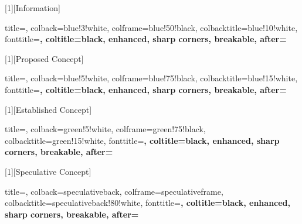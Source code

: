 \usepackage{etoolbox}
\usepackage[most]{tcolorbox}
\usepackage{graphicx}
\usepackage{xparse}

\usepackage{float}
\let\origfigure\figure
\let\endorigfigure\endfigure
\renewenvironment{figure}[1][H]{\origfigure[H]}{\endorigfigure}

\usepackage{xcolor}

\usepackage{longtable}
\usepackage{etoolbox}
\makeatletter
\patchcmd\longtable{\par}{\par\raggedright}{}{}
\setlength{\LTleft}{0pt}
\setlength{\LTright}{0pt}
\makeatother

\usepackage{makeidx}
\makeindex


\newcommand{\blanktitle}{\mbox{}}

[1][Information]{%
  title=\ifstrempty{#1}{\blanktitle}{#1},
  colback=blue!3!white,
  colframe=blue!50!black,
  colbacktitle=blue!10!white,
  fonttitle=\bfseries,
  coltitle=black,
  enhanced, sharp corners, breakable,
  after=\par\vspace{6pt}
}

[1][Proposed Concept]{%
  title=\ifstrempty{#1}{\blanktitle}{#1},
  colback=blue!5!white,
  colframe=blue!75!black,
  colbacktitle=blue!15!white,
  fonttitle=\bfseries,
  coltitle=black,
  enhanced, sharp corners, breakable,
  after=\par\vspace{6pt}
}

[1][Established Concept]{%
  title=\ifstrempty{#1}{\blanktitle}{#1},
  colback=green!5!white,
  colframe=green!75!black,
  colbacktitle=green!15!white,
  fonttitle=\bfseries,
  coltitle=black,
  enhanced, sharp corners, breakable,
  after=\par\vspace{6pt}
}

[1][Speculative Concept]{%
  title=\ifstrempty{#1}{\blanktitle}{#1},
  colback=speculativeback,
  colframe=speculativeframe,
  colbacktitle=speculativeback!80!white, %
  fonttitle=\bfseries,
  coltitle=black,
  enhanced, sharp corners, breakable,
  after=\par\vspace{6pt}
}


